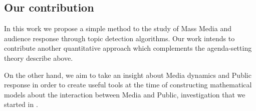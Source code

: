 
\subsection{Our contribution}

\par In this work we propose a simple method to the study of Mass Media and audience response through topic detection algorithms.
Our work intends to contribute another quantitative approach which complements the agenda-setting theory describe above. 
\par On the other hand, we aim to take an insight about Media dynamics and Public response in order to create useful tools at the time of constructing mathematical models about the interaction between Media and Public, investigation that we started in \cite{pinto2016setting}.
